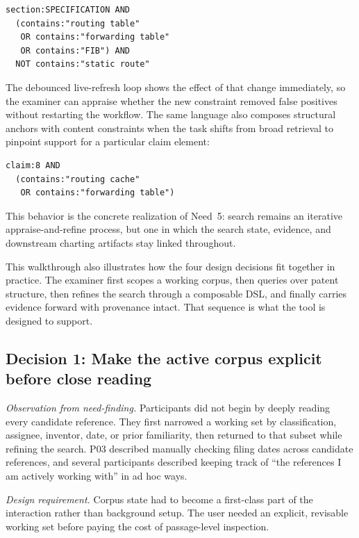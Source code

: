 \documentclass[sigconf]{acmart}
\begin{document}
\begin{lstlisting}[caption={Refining a noisy result set with explicit exclusion.}]
section:SPECIFICATION AND
  (contains:"routing table"
   OR contains:"forwarding table"
   OR contains:"FIB") AND
  NOT contains:"static route"
\end{lstlisting}

The debounced live-refresh loop shows the effect of that change immediately,
so the examiner can appraise whether the new constraint removed false positives
without restarting the workflow. The same language also composes structural
anchors with content constraints when the task shifts from broad retrieval to
pinpoint support for a particular claim element:

\begin{lstlisting}[caption={Combining claim anchors with content constraints.}]
claim:8 AND
  (contains:"routing cache"
   OR contains:"forwarding table")
\end{lstlisting}

This behavior is the concrete realization of Need~5: search remains an
iterative appraise-and-refine process, but one in which the search state,
evidence, and downstream charting artifacts stay linked throughout.

This walkthrough also illustrates how the four design decisions fit together in
practice. The examiner first scopes a working corpus, then queries over patent
structure, then refines the search through a composable DSL, and finally carries
evidence forward with provenance intact. That sequence is what the tool is
designed to support.


\subsection{Decision 1: Make the active corpus explicit before close reading}

\emph{Observation from need-finding.} Participants did not begin by deeply
reading every candidate reference. They first narrowed a working set by
classification, assignee, inventor, date, or prior familiarity, then returned
to that subset while refining the search. P03 described manually checking
filing dates across candidate references, and several participants described
keeping track of ``the references I am actively working with'' in ad hoc ways.

\emph{Design requirement.} Corpus state had to become a first-class part of
the interaction rather than background setup. The user needed an explicit,
revisable working set before paying the cost of passage-level inspection.
\end{document}
